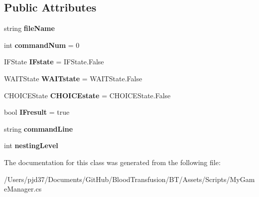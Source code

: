 \subsection*{Public Attributes}
\begin{DoxyCompactItemize}
\item 
string {\bfseries file\+Name}\hypertarget{class_command_sequence_a0b9b187c090f1b088518adb802b343d8}{}\label{class_command_sequence_a0b9b187c090f1b088518adb802b343d8}

\item 
int {\bfseries command\+Num} = 0\hypertarget{class_command_sequence_afe13c8bfa11220d47874dd3da1d92926}{}\label{class_command_sequence_afe13c8bfa11220d47874dd3da1d92926}

\item 
I\+F\+State {\bfseries I\+Fstate} = I\+F\+State.\+False\hypertarget{class_command_sequence_ac1302445b2951efaa118750ebcece9af}{}\label{class_command_sequence_ac1302445b2951efaa118750ebcece9af}

\item 
W\+A\+I\+T\+State {\bfseries W\+A\+I\+Tstate} = W\+A\+I\+T\+State.\+False\hypertarget{class_command_sequence_a948d080c59b810522789322e52f4fd8c}{}\label{class_command_sequence_a948d080c59b810522789322e52f4fd8c}

\item 
C\+H\+O\+I\+C\+E\+State {\bfseries C\+H\+O\+I\+C\+Estate} = C\+H\+O\+I\+C\+E\+State.\+False\hypertarget{class_command_sequence_a9c2cd280ee8ffc07fee4b5e1c7d710f6}{}\label{class_command_sequence_a9c2cd280ee8ffc07fee4b5e1c7d710f6}

\item 
bool {\bfseries I\+Fresult} = true\hypertarget{class_command_sequence_a3ce6cea704cdb07f8fb461551ba6aa38}{}\label{class_command_sequence_a3ce6cea704cdb07f8fb461551ba6aa38}

\item 
string {\bfseries command\+Line}\hypertarget{class_command_sequence_a46bb9ae9f3ba69d7232aad2874963fcb}{}\label{class_command_sequence_a46bb9ae9f3ba69d7232aad2874963fcb}

\item 
int {\bfseries nesting\+Level}\hypertarget{class_command_sequence_af5b70bab8b5855819bfe7c7ce62db106}{}\label{class_command_sequence_af5b70bab8b5855819bfe7c7ce62db106}

\end{DoxyCompactItemize}


The documentation for this class was generated from the following file\+:\begin{DoxyCompactItemize}
\item 
/\+Users/pjd37/\+Documents/\+Git\+Hub/\+Blood\+Transfusion/\+B\+T/\+Assets/\+Scripts/My\+Game\+Manager.\+cs\end{DoxyCompactItemize}
